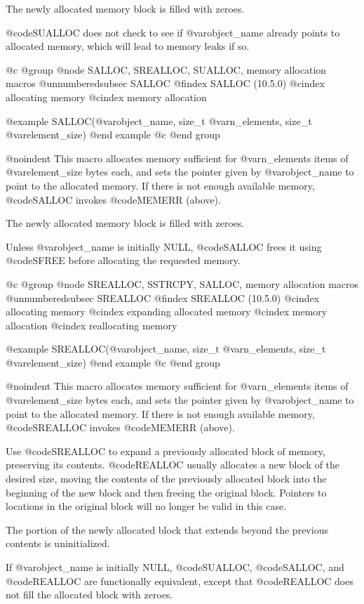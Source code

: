 {{{{{{{{{The newly allocated memory block is filled with zeroes.

@code{SUALLOC} does not check to see if @var{object_name} already points to
allocated memory, which will lead to memory leaks if so.

@c @group
@node     SALLOC, SREALLOC, SUALLOC, memory allocation macros
@unnumberedsubsec SALLOC
@findex SALLOC (10.5.0)
@cindex allocating memory
@cindex memory allocation

@example
SALLOC(@var{object_name}, size_t @var{n_elements}, size_t @var{element_size})
@end example
@c @end group

@noindent
This macro allocates memory sufficient for @var{n_elements} items of
@var{element_size} bytes each, and sets the pointer given by @var{object_name}
to point to the allocated memory.  If there is not enough available memory,
@code{SALLOC} invokes @code{MEMERR} (above).

The newly allocated memory block is filled with zeroes.

Unless @var{object_name} is initially NULL, @code{SALLOC} frees it using
@code{SFREE} before allocating the requested memory.

@c @group
@node     SREALLOC, SSTRCPY, SALLOC, memory allocation macros
@unnumberedsubsec SREALLOC
@findex SREALLOC (10.5.0)
@cindex allocating memory
@cindex expanding allocated memory
@cindex memory allocation
@cindex reallocating memory

@example
SREALLOC(@var{object_name}, size_t @var{n_elements}, size_t @var{element_size})
@end example
@c @end group

@noindent
This macro allocates memory sufficient for @var{n_elements} items of
@var{element_size} bytes each, and sets the pointer given by @var{object_name}
to point to the allocated memory.  If there is not enough available memory,
@code{SREALLOC} invokes @code{MEMERR} (above).

Use @code{SREALLOC} to expand a previously allocated block of memory,
preserving its contents.  @code{REALLOC} usually allocates a new block of the
desired size, moving the contents of the previously allocated block into
the beginning of the new block and then freeing the original block.  Pointers
to locations in the original block will no longer be valid in this case.

The portion of the newly allocated block that extends beyond the previous
contents is uninitialized.

If @var{object_name} is initially NULL, @code{SUALLOC}, @code{SALLOC}, and
@code{REALLOC} are functionally equivalent, except that @code{REALLOC} does
not fill the allocated block with zeroes.

}}}}}}}}}
